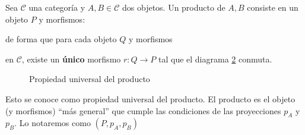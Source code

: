 \begin{definicion} [Producto] \label{definicion_producto} 
    Sea $\mathscr{C}$ una categoría y $A,B \in \mathscr{C}$ dos objetos. Un producto de $A,B$ consiste en un objeto $P$ y morfismos:

    \begin{center}
    \end{center}
    de forma que para cada objeto $Q$ y morfismos


    \begin{figure}[htpb]
        \centering
        \label{diag:producto}
    \end{figure}
        
    en $\mathscr{C}$, existe un \textbf{único} morfismo $r: Q \longrightarrow P$ tal que el diagrama \ref{diag:universal-producto} conmuta.

    \begin{figure}[htpb]
        \centering
        \caption{Propiedad universal del producto}
        \label{diag:universal-producto}
    \end{figure} 
    
    Esto se conoce como propiedad universal del producto. El producto es el objeto (y morfismos) ``más general'' que cumple las condiciones de las proyecciones $p_{A}$ y $p_{B}$.
    Lo notaremos como $(P, p_{A}, p_{B})$   
\end{definicion}

